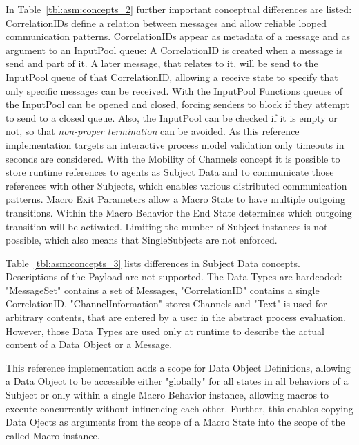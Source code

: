 In Table~\ref{tbl:asm:concepts_2} further important conceptual differences are listed:
CorrelationIDs define a relation between messages and allow reliable looped communication patterns.
CorrelationIDs appear as metadata of a message and as argument to an InputPool queue:
A CorrelationID is created when a message is send and part of it. A later message, that relates to it, will be send to the InputPool queue of that CorrelationID,
allowing a receive state to specify that only specific messages can be received.
With the InputPool Functions queues of the InputPool can be opened and closed, forcing senders to block if they attempt to send to a closed queue.
Also, the InputPool can be checked if it is empty or not, so that \textit{non-proper termination} can be avoided.
As this reference implementation targets an interactive process model validation only timeouts in seconds are considered.
With the Mobility of Channels concept it is possible to store runtime references to agents as Subject Data and to communicate those references with other Subjects,
which enables various distributed communication patterns.
Macro Exit Parameters allow a Macro State to have multiple outgoing transitions.
Within the Macro Behavior the End State determines which outgoing transition will be activated.
Limiting the number of Subject instances is not possible, which also means that SingleSubjects are not enforced.

Table~\ref{tbl:asm:concepts_3} lists differences in Subject Data concepts.
Descriptions of the Payload are not supported.
The Data Types are hardcoded:
"MessageSet" contains a set of Messages,
"CorrelationID" contains a single CorrelationID,
"ChannelInformation" stores Channels and
"Text" is used for arbitrary contents, that are entered by a user in the abstract process evaluation.
However, those Data Types are used only at runtime to describe the actual content of a Data Object or a Message.

This reference implementation adds a scope for Data Object Definitions,
allowing a Data Object to be accessible either "globally" for all states in all behaviors of a Subject or
only within a single Macro Behavior instance, allowing macros to execute concurrently without influencing each other.
Further, this enables copying Data Ojects as arguments from the scope of a Macro State into the scope of the called Macro instance.

